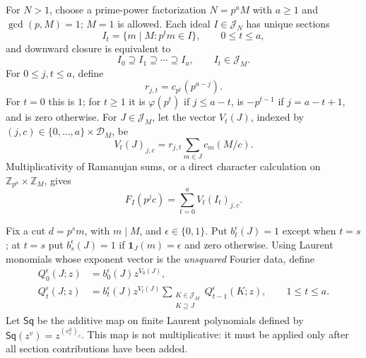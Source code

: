 \documentclass[11pt]{article}
\numberwithin{equation}{section}
\theoremstyle{definition}
\theoremstyle{remark}
\begin{document}
For $N>1$, choose a prime-power factorization $N=p^aM$ with
$a\ge1$ and $\gcd(p,M)=1$; $M=1$ is allowed.  Each ideal $I\in\mathcal J_N$
has unique sections
\[
 I_t=\{m\mid M:p^tm\in I\},\qquad 0\le t\le a,
\]
and downward closure is equivalent to
\begin{equation}\label{eq:ideal-flag}
 I_0\supseteq I_1\supseteq\cdots\supseteq I_a,
 \qquad I_t\in\mathcal J_M.
\end{equation}
For $0\le j,t\le a$, define
\[
 r_{j,t}=c_{p^t}(p^{a-j}).
\]
For $t=0$ this is $1$; for $t\ge1$ it is $\varphi(p^t)$ if
$j\le a-t$, is $-p^{t-1}$ if $j=a-t+1$, and is zero otherwise.
For $J\in\mathcal J_M$, let the vector $V_t(J)$, indexed by
$(j,c)\in\{0,\ldots,a\}\times\mathcal D_M$, be
\begin{equation}\label{eq:factor-contribution}
 V_t(J)_{j,c}=r_{j,t}\sum_{m\in J}c_m(M/c).
\end{equation}
Multiplicativity of Ramanujan sums, or a direct character calculation on
$\mathbb Z_{p^a}\times\mathbb Z_M$, gives
\begin{equation}\label{eq:factor-spectral-sum}
 F_I(p^jc)=\sum_{t=0}^a V_t(I_t)_{j,c}.
\end{equation}

Fix a cut $d=p^sm$, with $m\mid M$, and $\epsilon\in\{0,1\}$.
Put $b_t^{\epsilon}(J)=1$ except when $t=s$; at $t=s$ put
$b_s^{\epsilon}(J)=1$ if $\mathbf1_J(m)=\epsilon$ and zero otherwise.
Using Laurent monomials whose exponent vector is the \emph{unsquared}
Fourier data, define
\begin{align}
 Q_0^{\epsilon}(J;z)&=b_0^{\epsilon}(J)z^{V_0(J)},\label{eq:transfer-start}\\
 Q_t^{\epsilon}(J;z)&=b_t^{\epsilon}(J)z^{V_t(J)}
          \sum_{\substack{K\in\mathcal J_M\\K\supseteq J}}
                    Q_{t-1}^{\epsilon}(K;z),\qquad 1\le t\le a.
 \label{eq:transfer-step}
\end{align}
Let $\mathsf{Sq}$ be the additive map on finite Laurent polynomials defined
by $\mathsf{Sq}(z^v)=z^{(v_c^2)_c}$.  This map is not multiplicative: it
must be applied only after all section contributions have been added.
\end{document}
